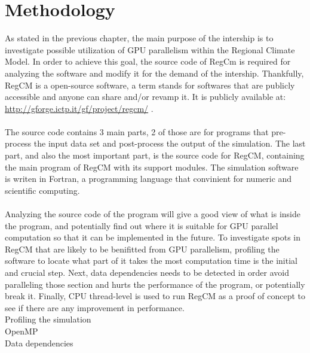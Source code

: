 \chapter{Methodology}

As stated in the previous chapter, the main purpose of the intership is to investigate possible utilization of GPU parallelism within the Regional Climate Model. In order to achieve this goal, the source code of RegCm is required for analyzing the software and modify it for the demand of the intership. Thankfully, RegCM is a open-source software, a term stands for softwares that are publicly accessible and anyone can share and/or revamp it. It is publicly available at: \url{http://gforge.ictp.it/gf/project/regcm/} . \\
~\\
The source code contains 3 main parts, 2 of those are for programs that pre-process the input data set and post-process the output of the simulation. The last part, and also the most important part, is the source code for RegCM, containing the main program of RegCM with its support modules. The simulation software is writen in Fortran, a programming language that convinient for numeric and scientific computing. \\
~\\
Analyzing the source code of the program will give a good view of what is inside the program, and potentially find out where it is suitable for GPU parallel computation so that it can be implemented in the future. To investigate spots in RegCM that are likely to be benifitted from GPU parallelism, profiling the software to locate what part of it takes the most computation time is the initial and crucial step. Next, data dependencies needs to be detected in order avoid paralleling those section and hurts the performance of the program, or potentially break it. Finally, CPU thread-level is used to run RegCM as a proof of concept to see if there are any improvement in performance. \\

Profiling the simulation\\
OpenMP\\
Data dependencies\\
